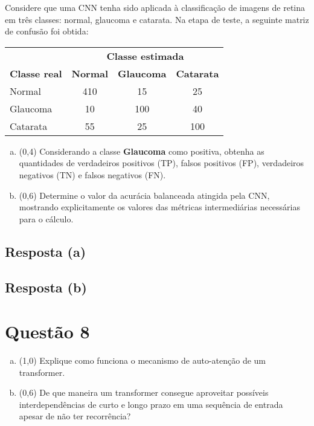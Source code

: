 \documentclass[final,3p]{elsarticle}
\numberwithin{equation}{section}
\begin{document}
    Considere que uma CNN tenha sido aplicada à classificação de imagens de retina em três classes: normal, glaucoma e catarata. Na etapa de teste, a seguinte matriz de confusão foi obtida:

    \begin{table}[h]
        \centering
        \begin{tabular}{l c c c}
            \toprule
             & \multicolumn{3}{c}{\textbf{Classe estimada}} \\
            \textbf{Classe real} & \textbf{Normal} & \textbf{Glaucoma} & \textbf{Catarata} \\
            \midrule
            Normal & 410 & 15 & 25 \\
            Glaucoma & 10 & 100 & 40 \\
            Catarata & 55 & 25 & 100 \\
            \bottomrule
        \end{tabular}
    \end{table}

    \begin{enumerate}[(a)]
        \item (0,4) Considerando a classe \textbf{Glaucoma} como positiva, obtenha as quantidades de verdadeiros positivos (TP), falsos positivos (FP), verdadeiros negativos (TN) e falsos negativos (FN).
        \item (0,6) Determine o valor da acurácia balanceada atingida pela CNN, mostrando explicitamente os valores das métricas intermediárias necessárias para o cálculo.
    \end{enumerate}

    \subsection{Resposta \textbf{(a)}}


    \subsection{Resposta \textbf{(b)}}


\section{Questão 8}

    \begin{enumerate}[(a)]
        \item (1,0) Explique como funciona o mecanismo de auto-atenção de um transformer.
        \item (0,6) De que maneira um transformer consegue aproveitar possíveis interdependências de curto e longo prazo em uma sequência de entrada apesar de não ter recorrência?
    \end{enumerate}
\end{document}
